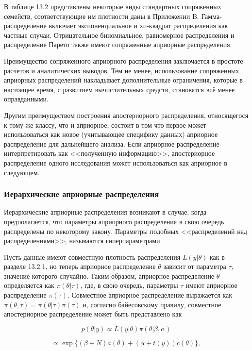 В таблице 13.2 представлены некоторые виды стандартных сопряженных семейств, соответствующие им плотности даны в Приложении B. Гамма-распределение включает экспоненциальное и хи-квадрат распределения как частные случаи. Отрицательное биномиальное, равномерное распределения и распределение Парето также имеют сопряженные априорные распределения.

Преимущество сопряженного априорного распределения заключается в простоте расчетов и аналитических выводов. Тем не менее, использование сопряженных априорных распределений накладывает дополнительные ограничения, которые в настоящее время, с развитием вычислительных средств, становятся всё менее оправданными.

Другим преимуществом построения апостериорного распределения, относящегося к тому же классу, что и априорное, состоит в том что первое может использоваться как новое (учитывающее специфику данных) априорное распределение для дальнейшего анализа. Если априорное распределение интерпретировать как <<полученную информацию>>, апостериорное распределение одного исследования может использоваться как априорное в следующем.


\subsubsection*{Иерархические априорные распределения}

Иерархические априорные распределения возникают в случае, когда предполагается, что  параметры априорного распределения в свою очередь распределены по некоторому закону. Параметры подобных <<распределений над распределениями>>, называются гиперпараметрами. 

Пусть данные имеют совместную плотность распределения $L(y|\theta)$ как в разделе 13.2.1, но теперь априорное распределение $\theta$ зависит от параметра $\tau$, значение которого случайно. Таким образом, априорное распределение $\theta$ определяется как $\pi(\theta|\tau)$, где, в свою очередь, параметры $\tau$ имеют априорное распределение $\pi(\tau)$. Совместное априорное распределение выражается как $\pi(\theta,\tau)=\pi(\theta|\tau)\pi(\tau)$ и, согласно байесовскому правилу, совместное апостериорное распределение может быть  представлено как

\begin{equation}
p(\theta|y){\propto}L(y|\theta)\pi(\theta|\beta,\alpha)
\end{equation}

\[
{\propto}\exp\lbrace{(\beta+N)a(\theta)+(\alpha+t(y))c(\theta)}\rbrace,
\]

